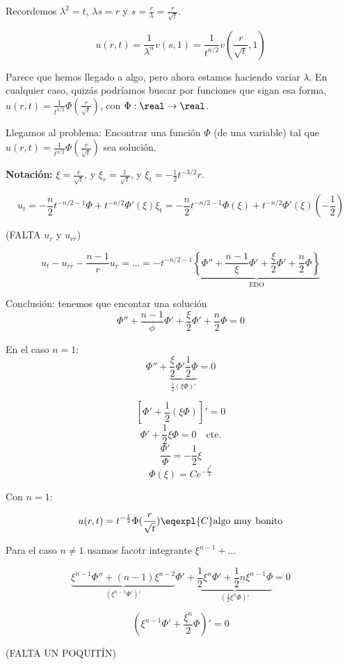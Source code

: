 		Recordemos $\lambda^2 = t$, $\lambda s = r$ y $s = \frac{r}{\lambda} = \frac{r}{\sqrt{t}}$.

		\[ u(r,t) = \frac{1}{\lambda^n} v(s,1) = \frac{1}{t^{n/2}} v\left(\frac{r}{\sqrt{t}},1\right)\]

		Parece que hemos llegado a algo, pero ahora estamos haciendo variar $λ$. En cualquier caso, quizás podríamos buscar por funciones que sigan esa forma, $u(r,t) = \frac{1}{t^{n/2}} \Phi\left(\frac{r}{\sqrt{t}}\right)$, con $\Phi: \real \rightarrow \real$.

		Llegamos al problema: Encontrar una función $\Phi$ (de una variable) tal que $u(r,t) = \frac{1}{t^{n/2}} \Phi(\frac{r}{\sqrt{t}})$ sea solución.

		\textbf{Notación: } $\xi = \frac{r}{\sqrt{t}}$, y $\xi_r = \frac{1}{\sqrt{t}}$, y $\xi_t = -\frac{1}{2} t^{-3/2} r$.

		\[ u_t = - \frac{n}{2} t^{-n/2-1} \Phi + t^{-n/2} \Phi' (\xi) \xi_t = -\frac{n}{2} t^{-n/2 - 1} \Phi(\xi) + t^{-n/2} \Phi'(\xi) (-\frac{1}{2}) \]

		(FALTA $u_r$ y $u_{rr}$)

		\[ u_t - u_{rr} - \frac{n-1}{r}u_r = … = - t^{-n/2 - 1} \underbrace{\left\{ \Phi'' + \frac{n-1}{\xi}\Phi' + \frac{\xi}{2}\Phi' + \frac{n}{2}\Phi \right\}}_{\text{EDO}} \]

		Conclusión: tenemos que encontar una solución
		\[ \Phi'' + \frac{n-1}{\phi} \Phi'+ \frac{\xi}{2}\Phi' + \frac{n}{2}\Phi = 0\]

		En el caso $n = 1$:
		\[ \Phi'' + \underbrace{\frac{\xi}{2}\Phi' \frac{1}{2}\Phi}_{\frac{1}{2} (\xi \Phi)'} = 0\]

		\[ \left[ \Phi' + \frac{1}{2} (\xi \Phi)  \right]' = 0\]
		\[ \Phi' + \frac{1}{2} \xi \Phi = 0 \quad \text{cte.}\]
		\[ \frac{\Phi'}{\Phi} = -\frac{1}{2} \xi\]
		\[ \Phi(\xi) = C e^{-\frac{\xi^2}{4}}\]

		Con $n=1$:

		\[ u(r,t) = t^{-\frac{1}{2}} \Phi(\frac{r}{\sqrt{t}}) \eqexpl{C}  \text{algo muy bonito}\]

		Para el caso $n \neq 1$ usamos facotr integrante $\xi^{n-1} + …$

		\[ \underbrace{\xi^{n-1} \Phi'' + (n-1) \xi^{n-2}}_{(\xi^{n-1}\Phi')'} \Phi' + \underbrace{\frac{1}{2}\xi^n \Phi' + \frac{1}{2} n \xi^{n-1} \Phi}_{(\frac{1}{2} \xi^n \Phi)'} = 0 \]

		\[ (\xi^{n-1} \Phi' + \frac{\xi^n}{2}\Phi)' = 0\]

		(FALTA UN POQUITÍN)

